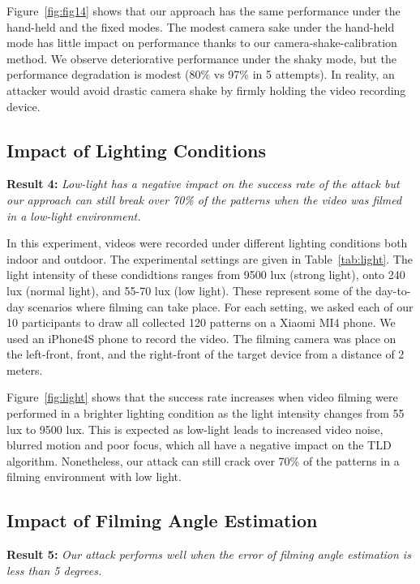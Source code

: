     Figure~\ref{fig:fig14} shows that our approach has the same performance under
    the hand-held and the fixed modes. The modest camera sake under the hand-held mode
    has little impact on performance thanks to our camera-shake-calibration method. We observe deteriorative performance
    under the shaky mode, but the performance degradation is modest (80\% vs 97\%
    in 5 attempts). In reality, an attacker would avoid drastic
    camera shake by firmly holding the video recording device.

    \subsection{Impact of Lighting Conditions \label{sec:light}}
    \noindent \textbf{Result 4:} \emph{Low-light has a negative impact on the success rate of the attack but our approach can still break over 70\% of the patterns when the video was filmed in a low-light environment.}

    In this experiment, videos were recorded under different lighting conditions both indoor and outdoor.
    The experimental settings are given in  Table~\ref{tab:light}.
    The light intensity of these condidtions ranges from 9500
    lux (strong light), onto 240 lux (normal light), and 55-70 lux (low light).
    These represent some of the day-to-day scenarios where filming can
    take place. For each setting, we asked each of our 10 participants to draw all collected 120 patterns on a Xiaomi MI4 phone. We used
    an iPhone4S phone to record the video. The filming camera was place on the
    left-front, front, and the right-front of the target device from a distance
    of 2 meters.


    Figure~\ref{fig:light} shows that the success rate increases when video filming were performed in a brighter lighting condition as the light intensity
    changes from 55 lux to 9500 lux. This is expected as low-light leads to
    increased video noise, blurred motion and poor focus, which all have a
    negative impact on the TLD algorithm. Nonetheless, our attack
    can still crack over 70\% of the patterns in a filming
    environment with low light.

    \subsection{Impact of Filming Angle Estimation \label{sec:angle}}

    \noindent \textbf{Result 5:} \emph{Our attack performs well when the error of filming angle estimation is less than 5 degrees.}

